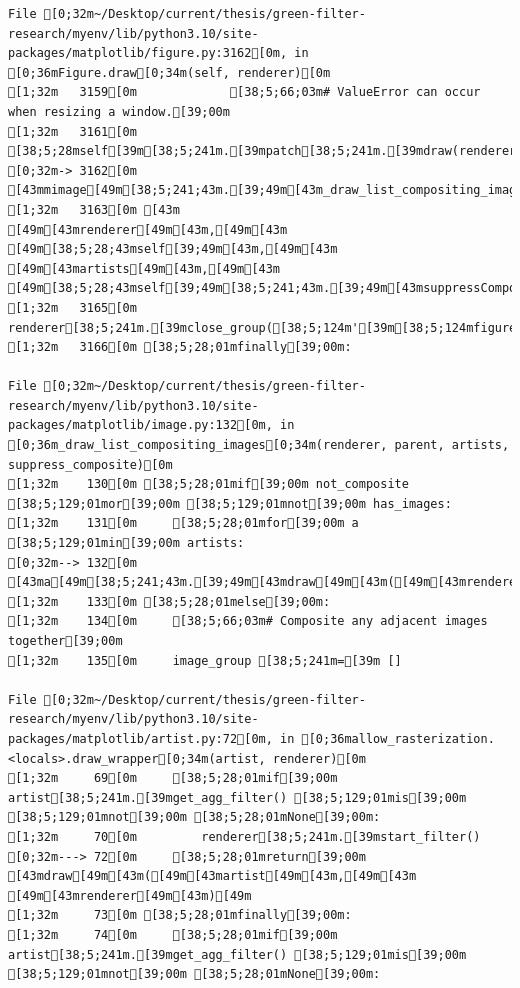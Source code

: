 \documentclass[
  letterpaper,
  DIV=11,
  numbers=noendperiod]{scrartcl}
\begin{document}
\begin{verbatim}
File [0;32m~/Desktop/current/thesis/green-filter-research/myenv/lib/python3.10/site-packages/matplotlib/figure.py:3162[0m, in [0;36mFigure.draw[0;34m(self, renderer)[0m
[1;32m   3159[0m             [38;5;66;03m# ValueError can occur when resizing a window.[39;00m
[1;32m   3161[0m     [38;5;28mself[39m[38;5;241m.[39mpatch[38;5;241m.[39mdraw(renderer)
[0;32m-> 3162[0m     [43mmimage[49m[38;5;241;43m.[39;49m[43m_draw_list_compositing_images[49m[43m([49m
[1;32m   3163[0m [43m        [49m[43mrenderer[49m[43m,[49m[43m [49m[38;5;28;43mself[39;49m[43m,[49m[43m [49m[43martists[49m[43m,[49m[43m [49m[38;5;28;43mself[39;49m[38;5;241;43m.[39;49m[43msuppressComposite[49m[43m)[49m
[1;32m   3165[0m     renderer[38;5;241m.[39mclose_group([38;5;124m'[39m[38;5;124mfigure[39m[38;5;124m'[39m)
[1;32m   3166[0m [38;5;28;01mfinally[39;00m:

File [0;32m~/Desktop/current/thesis/green-filter-research/myenv/lib/python3.10/site-packages/matplotlib/image.py:132[0m, in [0;36m_draw_list_compositing_images[0;34m(renderer, parent, artists, suppress_composite)[0m
[1;32m    130[0m [38;5;28;01mif[39;00m not_composite [38;5;129;01mor[39;00m [38;5;129;01mnot[39;00m has_images:
[1;32m    131[0m     [38;5;28;01mfor[39;00m a [38;5;129;01min[39;00m artists:
[0;32m--> 132[0m         [43ma[49m[38;5;241;43m.[39;49m[43mdraw[49m[43m([49m[43mrenderer[49m[43m)[49m
[1;32m    133[0m [38;5;28;01melse[39;00m:
[1;32m    134[0m     [38;5;66;03m# Composite any adjacent images together[39;00m
[1;32m    135[0m     image_group [38;5;241m=[39m []

File [0;32m~/Desktop/current/thesis/green-filter-research/myenv/lib/python3.10/site-packages/matplotlib/artist.py:72[0m, in [0;36mallow_rasterization.<locals>.draw_wrapper[0;34m(artist, renderer)[0m
[1;32m     69[0m     [38;5;28;01mif[39;00m artist[38;5;241m.[39mget_agg_filter() [38;5;129;01mis[39;00m [38;5;129;01mnot[39;00m [38;5;28;01mNone[39;00m:
[1;32m     70[0m         renderer[38;5;241m.[39mstart_filter()
[0;32m---> 72[0m     [38;5;28;01mreturn[39;00m [43mdraw[49m[43m([49m[43martist[49m[43m,[49m[43m [49m[43mrenderer[49m[43m)[49m
[1;32m     73[0m [38;5;28;01mfinally[39;00m:
[1;32m     74[0m     [38;5;28;01mif[39;00m artist[38;5;241m.[39mget_agg_filter() [38;5;129;01mis[39;00m [38;5;129;01mnot[39;00m [38;5;28;01mNone[39;00m:


\end{verbatim}
\end{document}
